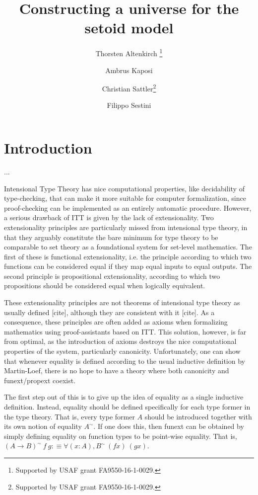 \documentclass{easychair}
\title{Constructing a universe for the setoid model}
\author{
  Thorsten Altenkirch \inst{1}\thanks{Supported by USAF grant FA9550-16-1-0029.}
\and
  Ambrus Kaposi \inst{2}
\and
  Christian Sattler\inst{1}\thanks{Supported by USAF grant FA9550-16-1-0029.}
\and
  Filippo Sestini\inst{1}
}
\institute{
  School of Computer Science, University of Nottingham, UK\\
  \email{\{psztxa,pszcs1,psxfs5\}@nottingham.ac.uk}
  \and
  E{\"o}tv{\"o}s Lor{\'a}nd University, Budapest, Hungary\\
  \email{akaposi@inf.elte.hu}
}
\begin{document}
\maketitle

\section{Introduction}

...


Intensional Type Theory has nice computational properties, like decidability of
type-checking, that can make it more suitable for computer formalization, since
proof-checking can be implemented as an entirely automatic procedure.
%
However, a serious drawback of ITT is given by the lack of extensionality.
%
Two extensionality principles are particularly missed from intensional type
theory, in that they arguably constitute the bare minimum for type theory to be
comparable to set theory as a foundational system for set-level mathematics.
%
The first of these is functional extensionality, i.e. the principle according to
which two functions can be considered equal if they map equal inputs to equal
outputs.
%
The second principle is propositional extensionality, according to which two
propositions should be considered equal when logically equivalent.

These extensionality principles are not theorems of intensional type theory as
usually defined [cite], although they are consistent with it [cite].
%
As a consequence, these principles are often added as axioms when formalizing
mathematics using proof-assistants based on ITT. This solution, however, is far
from optimal, as the introduction of axioms destroys the nice computational
properties of the system, particularly canonicity. Unfortunately, one can show
that whenever equality is defined according to the usual inductive definition by
Martin-Loef, there is no hope to have a theory where both canonicity and
funext/propext coexist.

The first step out of this is to give up the idea of equality as a single
inductive definition. Instead, equality should be defined specifically for each
type former in the type theory. That is, every type former $A$ should be
introduced together with its own notion of equality $A^\sim$.
%
If one does this, then funext can be obtained by simply defining equality on
function types to be point-wise equality. That is, $(A \to B)^\sim\ f\ g :\equiv
\forall (x : A) , B^\sim\ (f x)\ (g x)$.

\end{document}
